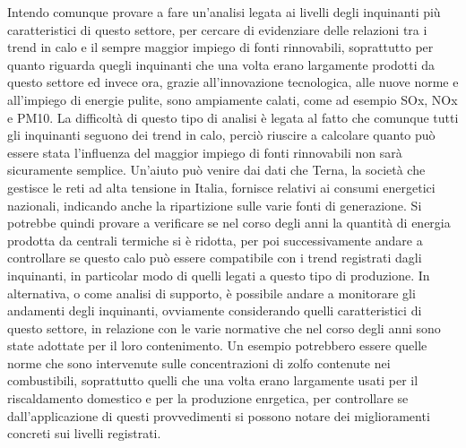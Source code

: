 \documentclass{article}
\begin{document}
Intendo comunque provare a fare un'analisi legata ai livelli degli inquinanti più caratteristici di questo settore, per cercare di evidenziare delle relazioni tra i trend in calo e il sempre maggior impiego di fonti rinnovabili, soprattutto per quanto riguarda quegli inquinanti che una volta erano largamente prodotti da questo settore ed invece ora, grazie all'innovazione tecnologica, alle nuove norme e all'impiego di energie pulite, sono ampiamente calati, come ad esempio SOx, NOx e PM10.
La difficoltà di questo tipo di analisi è legata al fatto che comunque tutti gli inquinanti seguono dei trend in calo, perciò riuscire a calcolare quanto può essere stata l'influenza del maggior impiego di fonti rinnovabili non sarà sicuramente semplice. Un'aiuto può venire dai dati che Terna, la società che gestisce le reti ad alta tensione in Italia, fornisce relativi ai consumi energetici nazionali, indicando anche la ripartizione sulle varie fonti di generazione. Si potrebbe quindi provare a verificare se nel corso degli anni la quantità di energia prodotta da centrali termiche si è ridotta, per poi successivamente andare a controllare se questo calo può essere compatibile con i trend registrati dagli inquinanti, in particolar modo di quelli legati a questo tipo di produzione. In alternativa, o come analisi di supporto, è possibile andare a monitorare gli andamenti degli inquinanti, ovviamente considerando quelli caratteristici di questo settore, in relazione con le varie normative che nel corso degli anni sono state adottate per il loro contenimento. Un esempio potrebbero essere quelle norme che sono intervenute sulle concentrazioni di zolfo contenute nei combustibili, soprattutto quelli che una volta erano largamente usati per il riscaldamento domestico e per la produzione enrgetica, per controllare se dall'applicazione di questi provvedimenti si possono notare dei miglioramenti concreti sui livelli registrati. 
\end{document}
